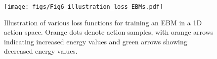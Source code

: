 

\begin{figure}
    \centering
    \texttt{[image: figs/Fig6\_illustration\_loss\_EBMs.pdf]}
	\caption{Illustration of various loss functions for training an EBM in a 1D action space. Orange dots denote action samples, with orange arrows indicating increased energy values and green arrows showing decreased energy values.}
 \label{fig:Fig6_illustration_loss_EBMs}
\end{figure}




